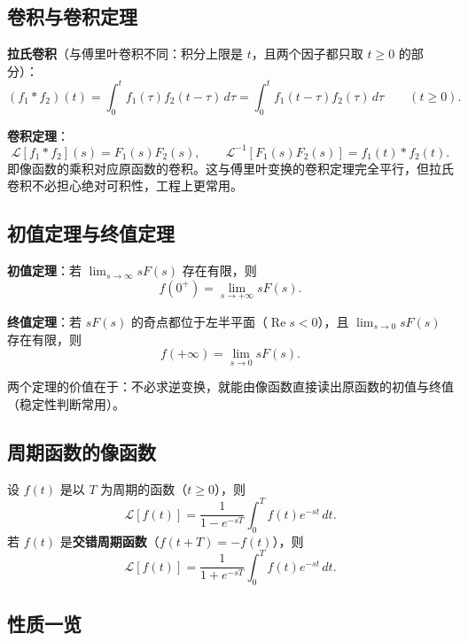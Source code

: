 \subsection{卷积与卷积定理}

\textbf{拉氏卷积}（与傅里叶卷积不同：积分上限是 \(t\)，且两个因子都只取 \(t\ge0\) 的部分）：
\[
(f_1*f_2)(t)=\int_0^tf_1(\tau)f_2(t-\tau)\,d\tau
=\int_0^tf_1(t-\tau)f_2(\tau)\,d\tau
\qquad(t\ge0).
\]

\textbf{卷积定理}：
\[
\mathscr{L}[f_1*f_2](s)=F_1(s)F_2(s),
\qquad
\mathscr{L}^{-1}[F_1(s)F_2(s)]=f_1(t)*f_2(t).
\]
即像函数的乘积对应原函数的卷积。这与傅里叶变换的卷积定理完全平行，但拉氏卷积不必担心绝对可积性，工程上更常用。

\subsection{初值定理与终值定理}

\textbf{初值定理}：若 \(\lim_{s\to\infty}sF(s)\) 存在有限，则
\[
f(0^+)=\lim_{s\to+\infty}sF(s).
\]

\textbf{终值定理}：若 \(sF(s)\) 的奇点都位于左半平面（\(\operatorname{Re}s<0\)），且 \(\lim_{s\to0}sF(s)\) 存在有限，则
\[
f(+\infty)=\lim_{s\to0}sF(s).
\]

两个定理的价值在于：不必求逆变换，就能由像函数直接读出原函数的初值与终值（稳定性判断常用）。

\subsection{周期函数的像函数}

设 \(f(t)\) 是以 \(T\) 为周期的函数（\(t\ge0\)），则
\[
\mathscr{L}[f(t)]=\frac{1}{1-e^{-sT}}\int_0^Tf(t)e^{-st}\,dt .
\]
若 \(f(t)\) 是\textbf{交错周期函数}（\(f(t+T)=-f(t)\)），则
\[
\mathscr{L}[f(t)]=\frac{1}{1+e^{-sT}}\int_0^Tf(t)e^{-st}\,dt .
\]

\subsection{性质一览}


